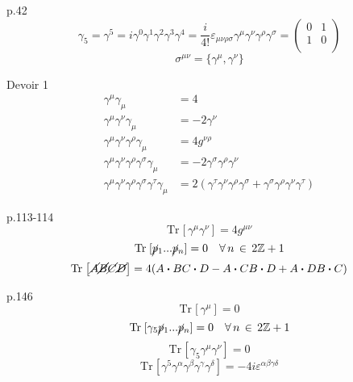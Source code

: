 \documentclass[12pt]{article}
\newcommand{\Z}{\mathbb{Z}}
\newcommand{\Tr}[1]{\mathrm{Tr}\hspace{1pt}\left[#1\right]}
\newcommand{\bdot}[0]{\boldsymbol{\cdot}}
\begin{document}
p.42 \\
\begin{equation}
  \gamma_5 = \gamma^5 = i\gamma^0\gamma^1\gamma^2\gamma^3\gamma^4 = \frac{i}{4!}\varepsilon_{\mu\nu\rho\sigma}\gamma^\mu\gamma^\nu\gamma^\rho\gamma^\sigma=\begin{pmatrix}0 & 1 \\ 1 & 0\\
\end{pmatrix}
\end{equation}
\begin{equation}
  \sigma^{\mu\nu} = \{\gamma^\mu,\gamma^\nu\}
\end{equation}

Devoir 1 \\
\begin{align}
  \gamma^\mu\gamma_\mu &= 4 \\
  \gamma^\mu\gamma^\nu\gamma_\mu &= -2\gamma^\nu \\
  \gamma^\mu\gamma^\nu\gamma^\rho\gamma_\mu &= 4g^{\nu\rho}\\
  \gamma^\mu\gamma^\nu\gamma^\rho\gamma^\sigma\gamma_\mu &= -2\gamma^\sigma\gamma^\rho\gamma^\nu\\
  \gamma^\mu\gamma^\nu\gamma^\rho\gamma^\sigma\gamma^\tau\gamma_\mu &= 2(\gamma^\tau\gamma^\nu\gamma^\rho\gamma^\sigma + \gamma^\sigma\gamma^\rho\gamma^\nu\gamma^\tau)
\end{align}

p.113-114 \\
\begin{equation}
  \Tr{\gamma^\mu\gamma^\nu} = 4g^{\mu\nu}
\end{equation}
\begin{equation}
  \Tr{\cancel{p}_1...\cancel{p}_n} = 0 \quad \forall\, n\, \in \, 2\Z+1
\end{equation}
\begin{equation}
  \Tr{\cancel{A}\cancel{B}\cancel{C}\cancel{D}} = 4(A\bdot B C \bdot D - A \bdot C B \bdot D + A \bdot D B \bdot C )
\end{equation}

p.146 \\
\begin{equation}
  \Tr{\gamma^\mu} = 0
\end{equation}
\begin{equation}
  \Tr{\gamma_5\cancel{p}_1...\cancel{p}_n} = 0 \quad \forall\, n\, \in \, 2\Z+1
\end{equation}
\begin{equation}
  \Tr{\gamma_5\gamma^\mu\gamma^\nu} = 0
\end{equation}
\begin{equation}
  \Tr{\gamma^5\gamma^\alpha\gamma^\beta\gamma^\gamma\gamma^\delta} = -4i\varepsilon^{\alpha\beta\gamma\delta}
\end{equation}
\end{document}
